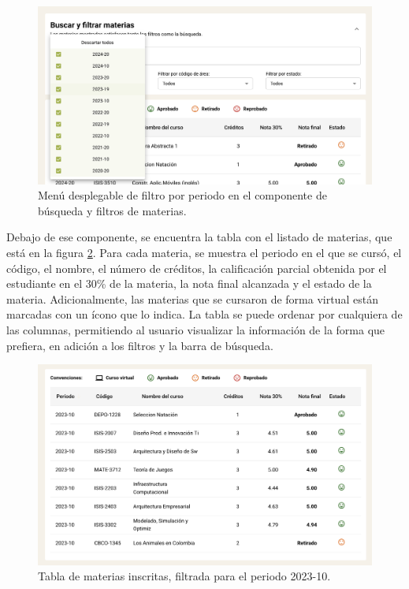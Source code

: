 \begin{figure}[H]
	\includegraphics[width=\textwidth]{assets/nes/filtro_periodo_materias.png}
	\caption{Menú desplegable de filtro por periodo en el componente de búsqueda y filtros de materias.}
	\label{fig:filtro_periodo_materias}
\end{figure}

Debajo de ese componente, se encuentra la tabla con el listado de materias, que está en la figura \ref{fig:tabla_materias}. Para cada materia, se muestra el periodo en el que se cursó, el código, el nombre, el número de créditos, la calificación parcial obtenida por el estudiante en el 30\% de la materia, la nota final alcanzada y el estado de la materia. Adicionalmente, las materias que se cursaron de forma virtual están marcadas con un ícono que lo indica. La tabla se puede ordenar por cualquiera de las columnas, permitiendo al usuario visualizar la información de la forma que prefiera, en adición a los filtros y la barra de búsqueda.

\begin{figure}[H]
	\includegraphics[width=\textwidth]{assets/nes/tabla_materias.png}
	\caption{Tabla de materias inscritas, filtrada para el periodo 2023-10.}
	\label{fig:tabla_materias}
\end{figure}

